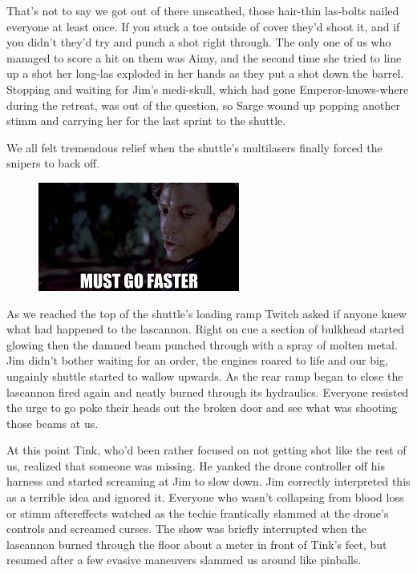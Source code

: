 That's not to say we got out of there unscathed, those hair-thin las-bolts nailed everyone at least once. 
If you stuck a toe outside of cover they'd shoot it, and if you didn't they'd try and punch a shot right through. 
The only one of us who managed to score a hit on them was Aimy, and the second time she tried to line up a shot her long-las exploded in her hands as they put a shot down the barrel. 
Stopping and waiting for Jim's medi-skull, which had gone Emperor-knows-where during the retreat, was out of the question, so Sarge wound up popping another stimm and carrying her for the last sprint to the shuttle. 


We all felt tremendous relief when the shuttle's multilasers finally forced the snipers to back off.

\begin{figure}
	\begin{center}
		\includegraphics[width=\figwidth]{pics/11/27.png}
	\end{center}
\end{figure}
As we reached the top of the shuttle's loading ramp Twitch asked if anyone knew what had happened to the lascannon. 
Right on cue a section of bulkhead started glowing then the damned beam punched through with a spray of molten metal. 
Jim didn't bother waiting for an order, the engines roared to life and our big, ungainly shuttle started to wallow upwards. 
As the rear ramp began to close the lascannon fired again and neatly burned through its hydraulics. 
Everyone resisted the urge to go poke their heads out the broken door and see what was shooting those beams at us.

At this point Tink, who'd been rather focused on not getting shot like the rest of us, realized that someone was missing. 
He yanked the drone controller off his harness and started screaming at Jim to slow down. 
Jim correctly interpreted this as a terrible idea and ignored it. 
Everyone who wasn't collapsing from blood loss or stimm aftereffects watched as the techie frantically slammed at the drone's controls and screamed curses. 
The show was briefly interrupted when the lascannon burned through the floor about a meter in front of Tink's feet, but resumed after a few evasive maneuvers slammed us around like pinballs.

